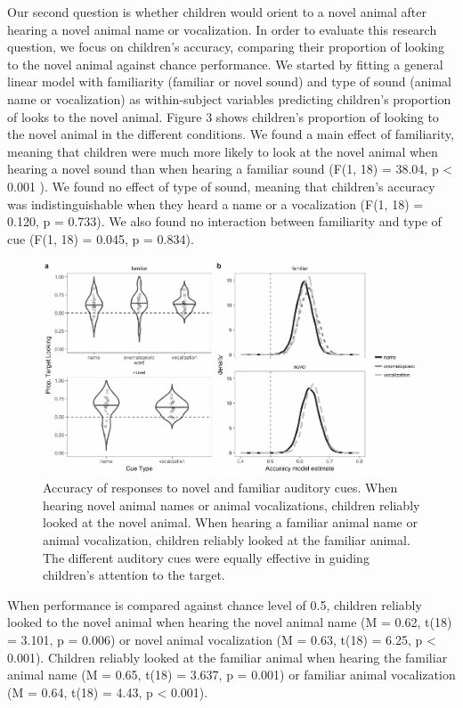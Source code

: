 \documentclass[english,floatsintext,man]{apa6}
\theoremstyle{definition}
\theoremstyle{definition}
\theoremstyle{definition}
\theoremstyle{remark}
\begin{document}
Our second question is whether children would orient to a novel animal
after hearing a novel animal name or vocalization. In order to evaluate
this research question, we focus on children's accuracy, comparing their
proportion of looking to the novel animal against chance performance. We
started by fitting a general linear model with familiarity (familiar or
novel sound) and type of sound (animal name or vocalization) as
within-subject variables predicting children's proportion of looks to
the novel animal. Figure 3 shows children's proportion of looking to the
novel animal in the different conditions. We found a main effect of
familiarity, meaning that children were much more likely to look at the
novel animal when hearing a novel sound than when hearing a familiar
sound (F(1, 18) = 38.04, p \textless{} 0.001 ). We found no effect of
type of sound, meaning that children's accuracy was indistinguishable
when they heard a name or a vocalization (F(1, 18) = 0.120, p = 0.733).
We also found no interaction between familiarity and type of cue (F(1,
18) = 0.045, p = 0.834).

\begin{figure}
\centering
\includegraphics{anime_manuscript_files/figure-latex/unnamed-chunk-7-1.pdf}
\caption{\label{fig:unnamed-chunk-7}Accuracy of responses to novel and
familiar auditory cues. When hearing novel animal names or animal
vocalizations, children reliably looked at the novel animal. When
hearing a familiar animal name or animal vocalization, children reliably
looked at the familiar animal. The different auditory cues were equally
effective in guiding children's attention to the target.}
\end{figure}

When performance is compared against chance level of 0.5, children
reliably looked to the novel animal when hearing the novel animal name
(M = 0.62, t(18) = 3.101, p = 0.006) or novel animal vocalization (M =
0.63, t(18) = 6.25, p \textless{} 0.001). Children reliably looked at
the familiar animal when hearing the familiar animal name (M = 0.65,
t(18) = 3.637, p = 0.001) or familiar animal vocalization (M = 0.64,
t(18) = 4.43, p \textless{} 0.001).
\end{document}
